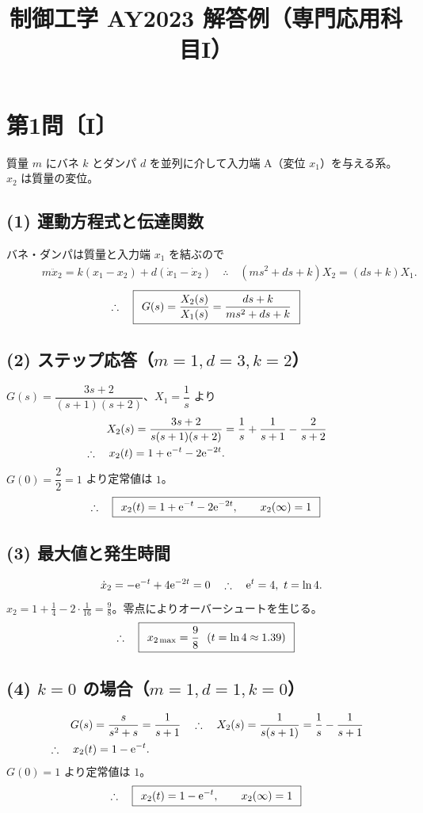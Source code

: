 \documentclass[11pt,a4paper]{article}
\title{制御工学 AY2023 解答例（専門応用科目I）}
\author{}
\date{}
\begin{document}
\maketitle

\section*{第1問〔I〕}

質量 $m$ にバネ $k$ とダンパ $d$ を並列に介して入力端 A（変位 $x_1$）を与える系。$x_2$ は質量の変位。

\subsection*{(1) 運動方程式と伝達関数}
バネ・ダンパは質量と入力端 $x_1$ を結ぶので
\begin{align*}
  &\qquad m\ddot{x}_2=k(x_1-x_2)+d(\dot{x}_1-\dot{x}_2)
   \quad\therefore\quad (ms^2+ds+k)X_2=(ds+k)X_1.
\end{align*}
\[
  \therefore\quad \boxed{\,\;G(s)=\dfrac{X_2(s)}{X_1(s)}=\dfrac{ds+k}{ms^2+ds+k}\;\,}
\]

\subsection*{(2) ステップ応答（$m=1,d=3,k=2$）}
$G(s)=\dfrac{3s+2}{(s+1)(s+2)}$、$X_1=\dfrac1s$ より
\begin{align*}
  &\qquad X_2(s)=\frac{3s+2}{s(s+1)(s+2)}=\frac{1}{s}+\frac{1}{s+1}-\frac{2}{s+2}\\
  &\therefore\quad x_2(t)=1+\mathrm{e}^{-t}-2\mathrm{e}^{-2t}.
\end{align*}
$G(0)=\dfrac22=1$ より定常値は $1$。
\[
  \therefore\quad \boxed{\,\;x_2(t)=1+\mathrm{e}^{-t}-2\mathrm{e}^{-2t},\qquad x_2(\infty)=1\;\,}
\]

\subsection*{(3) 最大値と発生時間}
\begin{align*}
  &\qquad \dot{x}_2=-\mathrm{e}^{-t}+4\mathrm{e}^{-2t}=0
   \quad\therefore\quad \mathrm{e}^{t}=4,\ t=\ln4.
\end{align*}
$x_2=1+\tfrac14-2\cdot\tfrac{1}{16}=\tfrac98$。零点によりオーバーシュートを生じる。
\[
  \therefore\quad \ans{\;x_{2\max}=\dfrac98\ \ (t=\ln4\approx1.39)\;}
\]

\subsection*{(4) $k=0$ の場合（$m=1,d=1,k=0$）}
\begin{align*}
  &\qquad G(s)=\frac{s}{s^2+s}=\frac{1}{s+1}
   \quad\therefore\quad X_2(s)=\frac{1}{s(s+1)}=\frac1s-\frac{1}{s+1}\\
  &\therefore\quad x_2(t)=1-\mathrm{e}^{-t}.
\end{align*}
$G(0)=1$ より定常値は $1$。
\[
  \therefore\quad \boxed{\,\;x_2(t)=1-\mathrm{e}^{-t},\qquad x_2(\infty)=1\;\,}
\]
\end{document}
